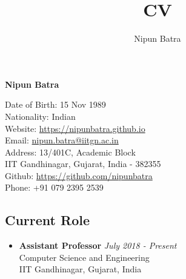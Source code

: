 \documentclass[letter,10pt]{article}
\title{CV}
\author{Nipun Batra}
\begin{document}
\setlength\itemsep{-1em}

\begin{center}
	\begin{Large}
		\textbf{Nipun Batra}\\
	\end{Large}
	
\end{center}



\begin{multicols}{2}
\begin{small}
\noindent Date of Birth: 15 Nov 1989 \\
Nationality: Indian \\
Website: \href{https://nipunbatra.github.io}{https://nipunbatra.github.io} \\ 
Email: \href{mailto:nipun.batra@iitgn.ac.in}{nipun.batra@iitgn.ac.in} \\
Address: 13/401C, Academic Block\\
	IIT Gandhinagar,
	Gujarat, India - 382355\\
Github: \href{https://github.com/nipunbatra}{https://github.com/nipunbatra}\\
Phone: +91 079 2395 2539
\end{small}
\end{multicols}

\subsection*{{\sc \textbf{Current Role}}\hspace{5pt}\noindent\hrulefill}
\begin{itemize}
\item[] 
    \textbf{Assistant Professor} \hfill \textit{July 2018 - Present}\\
    Computer Science and Engineering \\
	IIT Gandhinagar, Gujarat, India
	
	
\end{itemize}
\end{document}
